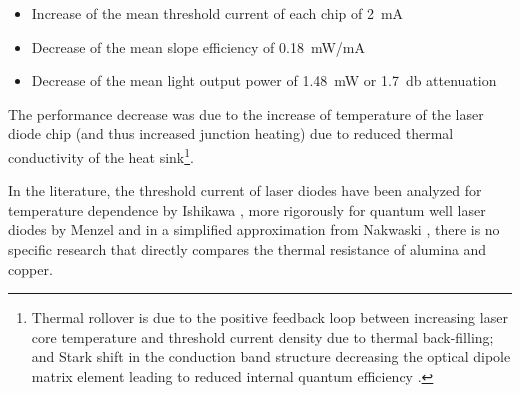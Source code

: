 

\begin{itemize}
\item Increase of the mean threshold current of each chip of \SI{2}{\milli\ampere}
\item Decrease of the mean slope efficiency of \SI{0.18}{\milli\watt/\milli\ampere}
\item Decrease of the mean light output power of \SI{1.48}{\milli\watt} or \SI{1.7}{\decibel} attenuation
\end{itemize}

The performance decrease was due to the increase of temperature of the laser diode chip (and thus increased junction heating) due to reduced thermal conductivity of the heat sink\footnote{Thermal rollover is due to the positive feedback loop between increasing laser core temperature and threshold current density due to thermal back-filling; and Stark shift in the conduction band structure decreasing the optical dipole matrix element leading to reduced internal quantum efficiency \cite{HowardLDTher08}.}. %




In the literature, the threshold current of  laser diodes have been analyzed for temperature dependence by Ishikawa \cite{IshikawaTempLD91}, more rigorously for  quantum well laser diodes by Menzel \cite{MenzelTempLD95} and in a simplified approximation from Nakwaski \cite{NakwaskiTempLD83}, there is no specific research that directly compares the thermal resistance of alumina and copper. %

